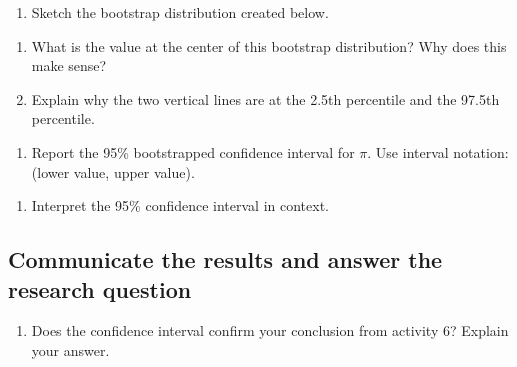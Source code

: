 \documentclass[
]{report}
\providecommand{\tightlist}{%
  \setlength{\itemsep}{0pt}\setlength{\parskip}{0pt}}
\begin{document}
\begin{enumerate}
\def\labelenumi{\arabic{enumi}.}
\setcounter{enumi}{6}
\tightlist
\item
  Sketch the bootstrap distribution created below.
\end{enumerate}

\vspace{1.8in}

\begin{enumerate}
\def\labelenumi{\arabic{enumi}.}
\setcounter{enumi}{7}
\item
  What is the value at the center of this bootstrap distribution? Why does this make sense?
  \vspace{.8in}
\item
  Explain why the two vertical lines are at the 2.5th percentile and the 97.5th percentile.
\end{enumerate}

\vspace{.8in}

\begin{enumerate}
\def\labelenumi{\arabic{enumi}.}
\setcounter{enumi}{9}
\tightlist
\item
  Report the 95\% bootstrapped confidence interval for \(\pi\). Use interval notation: (lower value, upper value).
\end{enumerate}

\vspace{0.3in}

\begin{enumerate}
\def\labelenumi{\arabic{enumi}.}
\setcounter{enumi}{10}
\tightlist
\item
  Interpret the 95\% confidence interval in context.
\end{enumerate}

\vspace{.8in}

\hypertarget{communicate-the-results-and-answer-the-research-question}{%
\subsection*{Communicate the results and answer the research question}\label{communicate-the-results-and-answer-the-research-question}}

\begin{enumerate}
\def\labelenumi{\arabic{enumi}.}
\setcounter{enumi}{11}
\tightlist
\item
  Does the confidence interval confirm your conclusion from activity 6? Explain your answer.
\end{enumerate}
\end{document}
